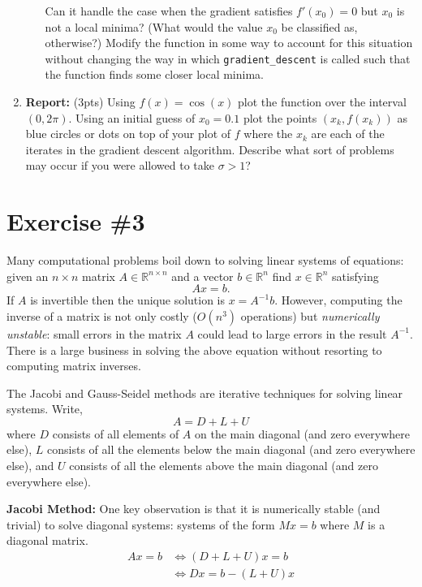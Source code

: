 \documentclass[12pt]{article}
\begin{document}
\begin{enumerate}
\begin{itemize}
      Can it handle the case when the gradient satisfies $f'(x_0) = 0$ but $x_0$
      is not a local minima? (What would the value $x_0$ be classified as,
      otherwise?) Modify the function in some way to account for this situation
      without changing the way in which {\tt gradient\_descent} is called such
      that the function finds some closer local minima.
  \end{itemize}
\item {\bf Report:} (3pts) Using $f(x) = \cos(x)$ plot the function over the
  interval $(0,2 \pi)$. Using an initial guess of $x_0 = 0.1$ plot the points
  $(x_k, f(x_k))$ as blue circles or dots on top of your plot of $f$ where the
  $x_k$ are each of the iterates in the gradient descent algorithm. Describe
  what sort of problems may occur if you were allowed to take $\sigma > 1$?
\end{enumerate}




\section*{Exercise \#3}



Many computational problems boil down to solving linear systems of equations:
given an $n \times n$ matrix $A \in \mathbb{R}^{n \times n}$ and a vector $b \in
\mathbb{R}^n$ find $x \in \mathbb{R}^n$ satisfying
\[
  Ax = b.
\]
If $A$ is invertible then the unique solution is $x = A^{-1}b$. However,
computing the inverse of a matrix is not only costly ($O(n^3)$ operations) but
{\it numerically unstable}: small errors in the matrix $A$ could lead to large
errors in the result $A^{-1}$. There is a large business in solving the above
equation without resorting to computing matrix inverses.

The Jacobi and Gauss-Seidel methods are iterative techniques for solving linear
systems. Write,
\[
  A = D + L + U
\]
where $D$ consists of all elements of $A$ on the main diagonal (and zero
everywhere else), $L$ consists of all the elements below the main diagonal (and
zero everywhere else), and $U$ consists of all the elements above the main
diagonal (and zero everywhere else).

{\bf Jacobi Method:} One key observation is that it is numerically stable (and
trivial) to solve diagonal systems: systems of the form $Mx=b$ where $M$ is a
diagonal matrix.
\begin{align*}
  Ax = b
& \Leftrightarrow
(D + L + U)x = b \\
&\Leftrightarrow
Dx = b - (L + U)x
\end{align*}
\end{document}
